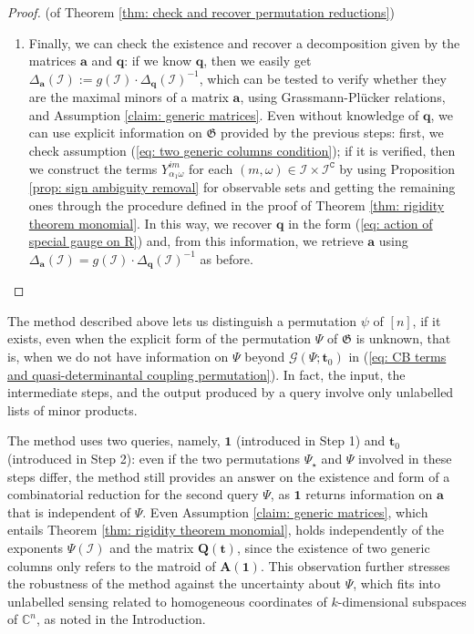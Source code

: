 \documentclass[10pt]{article}
\theoremstyle{remark}%
\theoremstyle{definition}%
\begin{document}
\begin{proof}{(of Theorem \ref{thm: check and recover permutation reductions})}
\begin{enumerate}
\item Finally, we can check the existence and recover a decomposition given by the matrices $\mathbf{a}$ and $\mathbf{q}$: if we know $\mathbf{q}$, then we easily get $\Delta_{\mathbf{a}}(\mathcal{I}):=g(\mathcal{I})\cdot \Delta_{\mathbf{q}}(\mathcal{I})^{-1}$, which can be tested to verify whether they are the maximal minors of a matrix $\mathbf{a}$, using Grassmann-Pl\"{u}cker relations, and Assumption \ref{claim: generic matrices}. Even without knowledge of $\mathbf{q}$, we can use explicit information on $\mathfrak{G}$ provided by the previous steps: first, we check assumption (\ref{eq: two generic columns condition}); if it is verified, then we construct the terms $Y_{\alpha_{1}\omega}^{im}$ for each $(m,\omega)\in\mathcal{I}\times\mathcal{I}^{\mathtt{C}}$ by using Proposition \ref{prop: sign ambiguity removal} for observable sets and getting the remaining ones through the procedure defined in the proof of Theorem \ref{thm: rigidity theorem monomial}. 
In this way, we recover $\mathbf{q}$ in the form (\ref{eq: action of special gauge on R}) and, from this information, we retrieve $\mathbf{a}$ using $\Delta_{\mathbf{a}}(\mathcal{I})=g(\mathcal{I})\cdot \Delta_{\mathbf{q}}(\mathcal{I})^{-1}$ as before. 
\end{enumerate}
\end{proof}
The method described above lets us distinguish a permutation $\psi$ of $[n]$, if it exists, even when the explicit form of the permutation $\Psi$ of $\mathfrak{G}$ is unknown, that is, when we do not have information on $\Psi$ beyond $\mathcal{G}(\Psi;\mathbf{t}_{0})$ in (\ref{eq: CB terms and quasi-determinantal coupling permutation}). In fact, the input, the intermediate steps, and the output produced by a query involve only unlabelled lists of minor products. 

The method uses two queries, namely, $\mathbf{1}$ (introduced in Step 1) and $\mathbf{t}_{0}$ (introduced in Step 2): even if the two permutations $\Psi_{\star}$ and $\Psi$ involved in these steps differ, the method still provides an answer on the existence and form of a combinatorial reduction for the second query $\Psi$, as $\mathbf{1}$ returns information on $\mathbf{a}$ that is independent of $\Psi$. Even Assumption \ref{claim: generic matrices}, which entails Theorem \ref{thm: rigidity theorem monomial}, holds independently of the exponents $\Psi(\mathcal{I})$ and the matrix $\mathbf{Q}(\mathbf{t})$, since the existence of two generic columns only refers to the matroid of $\mathbf{A}(\mathbf{1})$. This observation further stresses the robustness of the method against the uncertainty about $\Psi$, which fits into unlabelled sensing related to homogeneous coordinates of $k$-dimensional subspaces of $\mathbb{C}^{n}$, as noted in the Introduction. 
\end{document}
